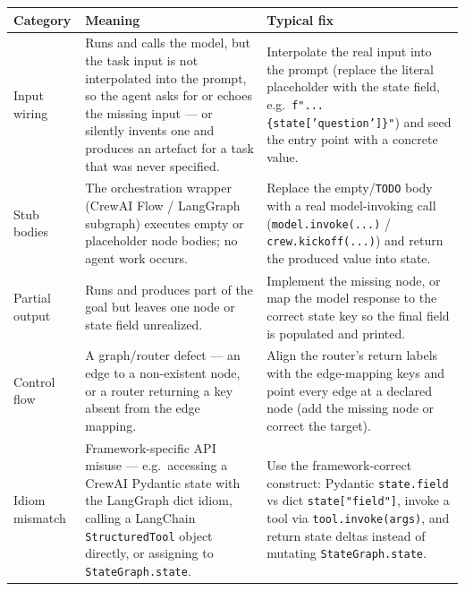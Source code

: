 \begin{table}[H]
\centering
\tiny
\footnotesize
\begin{tabular}{lp{4.7cm}p{5.0cm}}
\toprule
\textbf{Category} & \textbf{Meaning} & \textbf{Typical fix} \\
\midrule
Input wiring   & Runs and calls the model, but the task input is not interpolated
                 into the prompt, so the agent asks for or echoes the missing input
                 --- or silently invents one and produces an artefact for a task
                 that was never specified. &
                 Interpolate the real input into the prompt (replace the literal
                 placeholder with the state field, e.g.\ \texttt{f"...\{state['question']\}"})
                 and seed the entry point with a concrete value. \\
\addlinespace
Stub bodies    & The orchestration wrapper (CrewAI Flow / LangGraph subgraph)
                 executes empty or placeholder node bodies; no agent work occurs. &
                 Replace the empty/\texttt{TODO} body with a real model-invoking call
                 (\texttt{model.invoke(...)} / \texttt{crew.kickoff(...)}) and return
                 the produced value into state. \\
\addlinespace
Partial output & Runs and produces part of the goal but leaves one node or state
                 field unrealized. &
                 Implement the missing node, or map the model response to the correct
                 state key so the final field is populated and printed. \\
\addlinespace
Control flow   & A graph/router defect --- an edge to a non-existent node, or a
                 router returning a key absent from the edge mapping. &
                 Align the router's return labels with the edge-mapping keys and point
                 every edge at a declared node (add the missing node or correct the target). \\
\addlinespace
Idiom mismatch & Framework-specific API misuse --- e.g.\ accessing a CrewAI
                 Pydantic state with the LangGraph dict idiom, calling a LangChain
                 \texttt{StructuredTool} object directly, or assigning to
                 \texttt{StateGraph.state}. &
                 Use the framework-correct construct: Pydantic \texttt{state.field} vs
                 dict \texttt{state["field"]}, invoke a tool via \texttt{tool.invoke(args)},
                 and return state deltas instead of mutating \texttt{StateGraph.state}. \\

\end{tabular}
\end{table}
